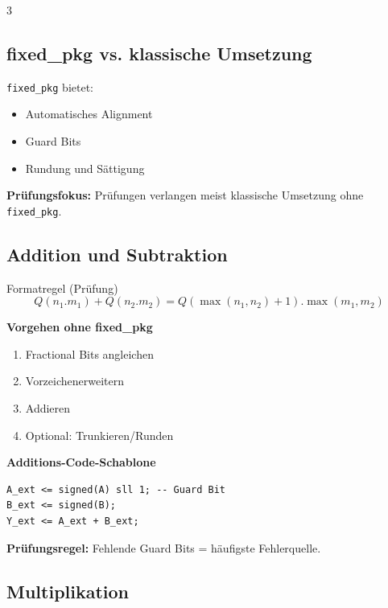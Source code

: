 \documentclass[10pt,a4paper]{article}
\newcommand{\hilite}[1]{\colorbox{yellow!25}{#1}}
\newcommand{\imp}[1]{\textbf{\textcolor{codeemph}{#1}}}
\begin{document}
\begin{multicols}{3}

\subsection{fixed\_pkg vs. klassische Umsetzung}

\texttt{fixed\_pkg} bietet:
\begin{itemize}
  \item Automatisches Alignment
  \item Guard Bits
  \item Rundung und Sättigung
\end{itemize}

\imp{Prüfungsfokus:}  
Prüfungen verlangen meist klassische Umsetzung ohne \texttt{fixed\_pkg}.


\subsection{Addition und Subtraktion}

\textcolor{codeemph}{Formatregel (Prüfung)}
\[
Q(n_1.m_1) + Q(n_2.m_2)
= Q(\max(n_1,n_2)+1).\max(m_1,m_2)
\]

\textbf{Vorgehen ohne fixed\_pkg}
\begin{enumerate}
  \item Fractional Bits angleichen
  \item Vorzeichenerweitern
  \item Addieren
  \item Optional: Trunkieren/Runden
\end{enumerate}

\textbf{Additions-Code-Schablone}
\begin{lstlisting}[emph={entity,architecture,process,rising_edge,signal,constant,generic,port},
                   emphstyle=\bfseries\color{codeemph}]
A_ext <= signed(A) sll 1; -- Guard Bit
B_ext <= signed(B);
Y_ext <= A_ext + B_ext;
\end{lstlisting}

\imp{Prüfungsregel:}  
\hilite{Fehlende Guard Bits} = häufigste Fehlerquelle.


\subsection{Multiplikation}


\end{multicols}
\end{document}
